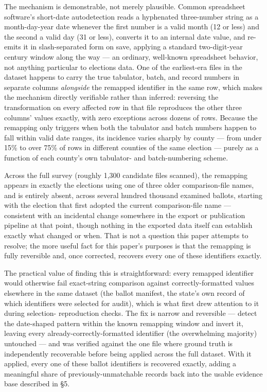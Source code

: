 The mechanism is demonstrable, not merely plausible. Common spreadsheet
software's short-date autodetection reads a hyphenated three-number string
as a month-day-year date whenever the first number is a valid month (12 or
less) and the second a valid day (31 or less), converts it to an internal
date value, and re-emits it in slash-separated form on save, applying a
standard two-digit-year century window along the way — an ordinary,
well-known spreadsheet behavior, not anything particular to elections
data. One of the earliest-era files in the dataset happens to carry the
true tabulator, batch, and record numbers in separate columns \textit{alongside}
the remapped identifier in the same row, which makes the mechanism
directly verifiable rather than inferred: reversing the transformation on
every affected row in that file reproduces the other three columns'
values exactly, with zero exceptions across dozens of rows. Because the
remapping only triggers when both the tabulator and batch numbers happen
to fall within valid date ranges, its incidence varies sharply by county —
from under 15\% to over 75\% of rows in different counties of the same
election — purely as a function of each county's own tabulator- and
batch-numbering scheme.

Across the full survey (roughly 1,300 candidate files scanned), the
remapping appears in exactly the elections using one of three older
comparison-file names, and is entirely absent, across several hundred
thousand examined ballots, starting with the election that first adopted
the current comparison-file name — consistent with an incidental change
somewhere in the export or publication pipeline at that point, though
nothing in the exported data itself can establish exactly what changed or
when. That is not a question this paper attempts to resolve; the more
useful fact for this paper's purposes is that the remapping is fully
reversible and, once corrected, recovers every one of these identifiers
exactly.

The practical value of finding this is straightforward: every remapped
identifier would otherwise fail exact-string comparison against
correctly-formatted values elsewhere in the same dataset (the ballot
manifest, the state's own record of which identifiers were selected for
audit), which is what first drew attention to it during selection-
reproduction checks. The fix is narrow and reversible — detect the
date-shaped pattern within the known remapping window and invert it,
leaving every already-correctly-formatted identifier (the overwhelming
majority) untouched — and was verified against the one file where ground
truth is independently recoverable before being applied across the full
dataset. With it applied, every one of these ballot identifiers is
recovered exactly, adding a meaningful share of previously-unmatchable
records back into the usable evidence base described in §5.

